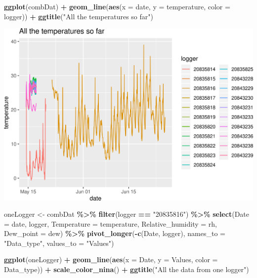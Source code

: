 \documentclass[]{article}
\newenvironment{Shaded}{\begin{snugshade}}{\end{snugshade}}
\newcommand{\DataTypeTok}[1]{\textcolor[rgb]{0.13,0.29,0.53}{#1}}
\newcommand{\KeywordTok}[1]{\textcolor[rgb]{0.13,0.29,0.53}{\textbf{#1}}}
\newcommand{\NormalTok}[1]{#1}
\newcommand{\OperatorTok}[1]{\textcolor[rgb]{0.81,0.36,0.00}{\textbf{#1}}}
\newcommand{\StringTok}[1]{\textcolor[rgb]{0.31,0.60,0.02}{#1}}
\begin{document}
\begin{Shaded}
\begin{Highlighting}[]
\KeywordTok{ggplot}\NormalTok{(combDat) }\OperatorTok{+}
\StringTok{  }\KeywordTok{geom\_line}\NormalTok{(}\KeywordTok{aes}\NormalTok{(}\DataTypeTok{x =}\NormalTok{ date, }\DataTypeTok{y =}\NormalTok{ temperature, }\DataTypeTok{color =}\NormalTok{ logger)) }\OperatorTok{+}
\StringTok{  }\KeywordTok{ggtitle}\NormalTok{(}\StringTok{"All the temperatures so far"}\NormalTok{)}
\end{Highlighting}
\end{Shaded}

\includegraphics{figure/unnamed-chunk-12-1.png}

\begin{Shaded}
\begin{Highlighting}[]
\NormalTok{oneLogger <{-}}\StringTok{ }\NormalTok{combDat }\OperatorTok{\%>\%}\StringTok{ }
\StringTok{  }\KeywordTok{filter}\NormalTok{(logger }\OperatorTok{==}\StringTok{ "20835816"}\NormalTok{) }\OperatorTok{\%>\%}\StringTok{ }
\StringTok{  }\KeywordTok{select}\NormalTok{(}\DataTypeTok{Date =}\NormalTok{ date, }
\NormalTok{         logger,}
         \DataTypeTok{Temperature =}\NormalTok{ temperature,}
         \DataTypeTok{Relative\_humidity =}\NormalTok{ rh,}
         \DataTypeTok{Dew\_point =}\NormalTok{ dew) }\OperatorTok{\%>\%}\StringTok{ }
\StringTok{  }\KeywordTok{pivot\_longer}\NormalTok{(}\OperatorTok{{-}}\KeywordTok{c}\NormalTok{(Date, logger),}
               \DataTypeTok{names\_to =} \StringTok{"Data\_type"}\NormalTok{,}
               \DataTypeTok{values\_to =} \StringTok{"Values"}\NormalTok{)}
  
\KeywordTok{ggplot}\NormalTok{(oneLogger) }\OperatorTok{+}
\StringTok{  }\KeywordTok{geom\_line}\NormalTok{(}\KeywordTok{aes}\NormalTok{(}\DataTypeTok{x =}\NormalTok{ Date, }\DataTypeTok{y =}\NormalTok{ Values, }\DataTypeTok{color =}\NormalTok{ Data\_type)) }\OperatorTok{+}
\StringTok{  }\KeywordTok{scale\_color\_nina}\NormalTok{() }\OperatorTok{+}
\StringTok{  }\KeywordTok{ggtitle}\NormalTok{(}\StringTok{"All the data from one logger"}\NormalTok{)}
\end{Highlighting}
\end{Shaded}
\end{document}
